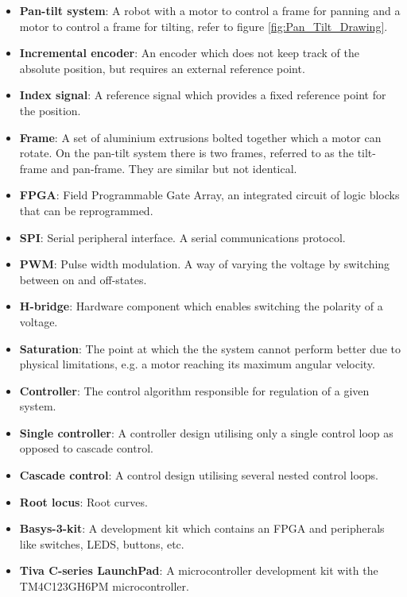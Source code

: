 \documentclass[../../main.tex]{subfiles}
\begin{document}
\label{sec:wordlist}
\begin{itemize}
    \item \textbf{Pan-tilt system}: A robot with a motor to control a frame for panning and a motor to control a frame for tilting, refer to figure \ref{fig:Pan_Tilt_Drawing}.
    \item \textbf{Incremental encoder}: An encoder which does not keep track of the absolute position, but requires an external reference point.
    \item \textbf{Index signal}: A reference signal which provides a fixed reference point for the position.
    \item \textbf{Frame}: A set of aluminium extrusions bolted together which a motor can rotate. On the pan-tilt system there is two frames, referred to as the tilt-frame and pan-frame. They are similar but not identical.
    \item \textbf{FPGA}: Field Programmable Gate Array, an integrated circuit of logic blocks that can be reprogrammed.
    \item \textbf{SPI}: Serial peripheral interface. A serial communications protocol.
    \item \textbf{PWM}: Pulse width modulation. A way of varying the voltage by switching between on and off-states.
    \item \textbf{H-bridge}: Hardware component which enables switching the polarity of a voltage.
    \item \textbf{Saturation}: The point at which the the system cannot perform better due to physical limitations, e.g. a motor reaching its maximum angular velocity.
    \item \textbf{Controller}: The control algorithm responsible for regulation of a given system.
    \item \textbf{Single controller}: A controller design utilising only a single control loop as opposed to cascade control.
    \item \textbf{Cascade control}: A control design utilising several nested control loops.
    \item \textbf{Root locus}: Root curves.
    \item \textbf{Basys-3-kit}: A development kit which contains an FPGA and peripherals like switches, LEDS, buttons, etc.
    
    \item \textbf{Tiva C-series LaunchPad}: A microcontroller development kit with the TM4C123GH6PM microcontroller.
    

\end{itemize}
\end{document}
